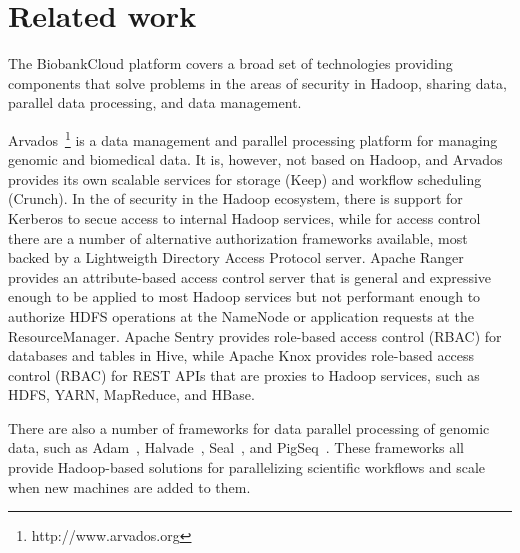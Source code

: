\section{Related work}

The BiobankCloud platform covers a broad set of technologies providing components that solve problems in the areas of security in Hadoop, sharing data, parallel data processing, and data management.

Arvados~\footnote{http://www.arvados.org} is a data management and parallel processing platform for managing genomic and biomedical data. It is, however, not based on Hadoop, and Arvados provides its own scalable services for storage (Keep) and workflow scheduling (Crunch).
In the of security in the Hadoop ecosystem, there is support for Kerberos to secue access to internal Hadoop services, while for access control there are a number of alternative authorization frameworks available, most backed by a Lightweigth Directory Access Protocol server. Apache Ranger provides an attribute-based access control server that is general and expressive enough to be applied to most Hadoop services but not performant enough to authorize HDFS operations at the NameNode or application requests at the ResourceManager. Apache Sentry provides role-based access control (RBAC) for databases and tables in Hive, while Apache Knox provides role-based access control (RBAC) for REST APIs that are proxies to Hadoop services, such as HDFS, YARN, MapReduce, and HBase. 

There are also a number of frameworks for data parallel processing of genomic data, such as Adam~\cite{adam15}, Halvade~\cite{halvade15}, Seal~\cite{seal11}, and PigSeq~\cite{seqpig14}. These frameworks all provide Hadoop-based solutions for parallelizing scientific workflows and scale when new machines are added to them.